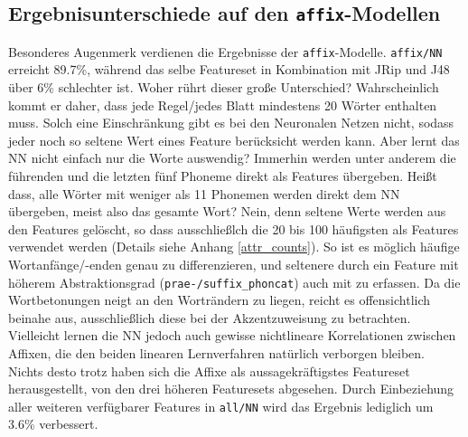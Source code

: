 \subsection{Ergebnisunterschiede auf den \texttt{affix}-Modellen}

Besonderes Augenmerk verdienen die Ergebnisse der \texttt{affix}-Modelle. \texttt{affix/NN} erreicht 89.7\%, während das selbe Featureset in Kombination mit JRip und J48 über 6\% schlechter ist. Woher rührt dieser große Unterschied? Wahrscheinlich kommt er daher, dass jede Regel/jedes Blatt mindestens 20 Wörter enthalten muss. Solch eine Einschränkung gibt es bei den Neuronalen Netzen nicht, sodass jeder noch so seltene Wert eines Feature berücksicht werden kann. Aber lernt das NN nicht einfach nur die Worte auswendig? Immerhin werden unter anderem die führenden und die letzten fünf Phoneme direkt als Features übergeben. Heißt dass, alle Wörter mit weniger als 11 Phonemen werden direkt dem NN übergeben, meist also das gesamte Wort? Nein, denn seltene Werte werden aus den Features gelöscht, so dass ausschließlch die 20 bis 100 häufigsten als Features verwendet werden (Details siehe Anhang \ref{attr_counts}). So ist es möglich häufige Wortanfänge/-enden genau zu differenzieren, und seltenere durch ein Feature mit höherem Abstraktionsgrad (\texttt{prae-/suffix\_phoncat}) auch mit zu erfassen. Da die Wortbetonungen neigt an den Worträndern zu liegen, reicht es offensichtlich beinahe aus, ausschließlich diese bei der Akzentzuweisung zu betrachten. Vielleicht lernen die NN jedoch auch gewisse nichtlineare Korrelationen zwischen Affixen, die den beiden linearen Lernverfahren natürlich verborgen bleiben. Nichts desto trotz haben sich die Affixe als aussagekräftigstes Featureset herausgestellt, von den drei höheren Featuresets abgesehen. Durch Einbeziehung aller weiteren verfügbarer Features in \texttt{all/NN} wird das Ergebnis lediglich um 3.6\% verbessert.

